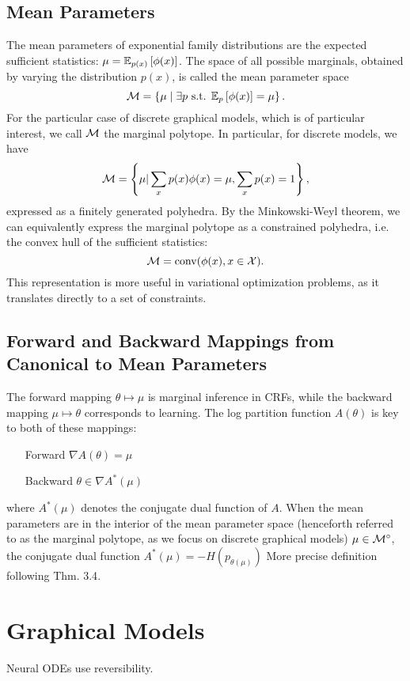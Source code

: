 \documentclass[11pt]{article}
\begin{document}
\subsection{Mean Parameters}
The mean parameters of exponential family distributions are the expected sufficient statistics:
$\mu = \mathbb{E}_{p(x)}\left[\phi(x)\right]$.
The space of all possible marginals, obtained by varying the distribution
$p(x)$, is called the mean parameter space
$$\mathcal{M} = \left\{\mu \mid \exists p \textrm{ s.t. } \mathbb{E}_{p}\left[\phi(x)\right] = \mu\right\}.$$
For the particular case of discrete graphical models,
which is of particular interest,
we call $\mathcal{M}$ the marginal polytope.
In particular, for discrete models, we have
$$\mathcal{M} = \left\{\mu | \sum_x p(x)\phi(x) = \mu, \sum_x p(x) = 1\right\},$$
expressed as a finitely generated polyhedra.
By the Minkowski-Weyl theorem, we can equivalently express the marginal polytope
as a constrained polyhedra, i.e. the convex hull of the sufficient statistics:
$$\mathcal{M} = \mathrm{conv}(\phi(x),x\in\mathcal{X}).$$
This representation is more useful in variational optimization problems,
as it translates directly to a set of constraints.

\subsection{Forward and Backward Mappings from Canonical to Mean Parameters}
The forward mapping $\theta\mapsto\mu$ is marginal inference in CRFs,
while the backward mapping $\mu\mapsto\theta$ corresponds to learning.
The log partition function $A(\theta)$ is key to both of these mappings:
\begin{itemize}
\item[Forward] $\nabla A(\theta) = \mu$
\item[Backward] $\theta \in \nabla A^*(\mu)$
\end{itemize}
where $A^*(\mu)$ denotes the conjugate dual function of $A$.
When the mean parameters are in the interior of the mean parameter space
(henceforth referred to as the marginal polytope, as we focus on discrete
graphical models)
$\mu\in\mathcal{M}^{\circ}$,
the conjugate dual function $A^*(\mu) = -H(p_{\theta(\mu)})$
{\color{red} More precise definition following \citet{vi} Thm. 3.4}.


\section{Graphical Models}

Neural ODEs use reversibility.
\end{document}
